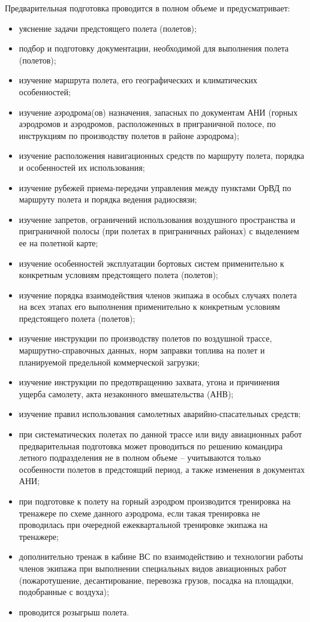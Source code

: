 Предварительная подготовка проводится в полном объеме и предусматривает:
\begin{itemize}
    \item уяснение задачи предстоящего полета (полетов);
    \item подбор и подготовку документации, необходимой для выполнения полета (полетов);
    \item изучение маршрута полета, его географических и климатических особенностей;
    \item изучение аэродрома(ов) назначения, запасных по документам АНИ (горных аэродромов и аэродромов, расположенных в приграничной полосе, по инструкциям по производству полетов в районе аэродрома);
    \item изучение расположения навигационных средств по маршруту полета, порядка и особенностей их
использования;
    \item изучение рубежей приема-передачи управления между пунктами ОрВД по маршруту полета и порядка ведения радиосвязи;
    \item изучение запретов, ограничений использования воздушного пространства и приграничной полосы (при полетах в приграничных районах) с выделением ее на полетной карте;
    \item изучение особенностей эксплуатации бортовых систем применительно к конкретным условиям предстоящего полета (полетов);
    \item изучение порядка взаимодействия членов экипажа в особых случаях полета на всех этапах его выполнения применительно к конкретным условиям предстоящего полета (полетов);
    \item изучение инструкции по производству полетов по воздушной трассе, маршрутно-справочных данных, норм заправки топлива на полет и планируемой предельной коммерческой загрузки;
    \item изучение инструкции по предотвращению захвата, угона и причинения ущерба самолету, акта незаконного вмешательства (АНВ);
    \item изучение правил использования самолетных аварийно-спасательных средств;
    \item при систематических полетах по данной трассе или виду авиационных работ предварительная подготовка может проводиться по решению командира летного подразделения не в полном объеме – учитываются только особенности полетов в предстоящий период, а также изменения в документах АНИ;
    \item при подготовке к полету на горный аэродром производится тренировка на тренажере по схеме 
данного аэродрома, если такая тренировка не проводилась при очередной ежеквартальной тренировке экипажа на тренажере;
    \item дополнительно тренаж в кабине ВС по взаимодействию и технологии работы членов экипажа при выполнении специальных видов авиационных работ (пожаротушение, десантирование, перевозка грузов, посадка на площадки, подобранные с воздуха);
    \item проводится розыгрыш полета.
\end{itemize}

